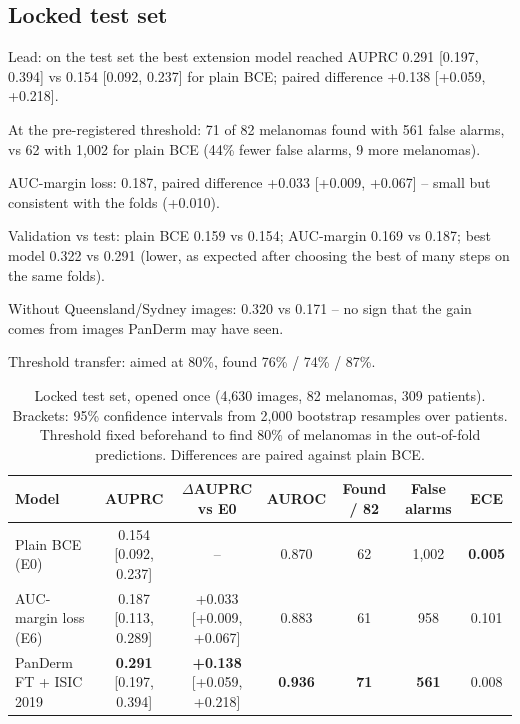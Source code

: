 \subsection{Locked test set}
\begin{notes}
  \item Lead: on the test set the best extension model reached AUPRC 0.291 [0.197, 0.394] vs 0.154 [0.092, 0.237] for plain BCE; paired difference +0.138 [+0.059, +0.218].
  \item At the pre-registered threshold: 71 of 82 melanomas found with 561 false alarms, vs 62 with 1,002 for plain BCE (44\% fewer false alarms, 9 more melanomas).
  \item AUC-margin loss: 0.187, paired difference +0.033 [+0.009, +0.067] -- small but consistent with the folds (+0.010).
  \item Validation vs test: plain BCE 0.159 vs 0.154; AUC-margin 0.169 vs 0.187; best model 0.322 vs 0.291 (lower, as expected after choosing the best of many steps on the same folds).
  \item Without Queensland/Sydney images: 0.320 vs 0.171 -- no sign that the gain comes from images PanDerm may have seen.
  \item Threshold transfer: aimed at 80\%, found 76\% / 74\% / 87\%.
\end{notes}

\begin{table}[t]
\centering
\caption{Locked test set, opened once (4,630 images, 82 melanomas, 309 patients). Brackets: 95\% confidence intervals from 2,000 bootstrap resamples over patients. Threshold fixed beforehand to find 80\% of melanomas in the out-of-fold predictions. Differences are paired against plain BCE.}
\label{tab:test}
\small
\begin{tabular}{@{}lcccccc@{}}
\toprule
Model & AUPRC & $\Delta$AUPRC vs E0 & AUROC & Found / 82 & False alarms & ECE \\
\midrule
Plain BCE (E0) & 0.154 [0.092, 0.237] & -- & 0.870 & 62 & 1,002 & \textbf{0.005} \\
AUC-margin loss (E6) & 0.187 [0.113, 0.289] & +0.033 [+0.009, +0.067] & 0.883 & 61 & 958 & 0.101 \\
PanDerm FT + ISIC 2019 & \textbf{0.291} [0.197, 0.394] & \textbf{+0.138} [+0.059, +0.218] & \textbf{0.936} & \textbf{71} & \textbf{561} & 0.008 \\
\bottomrule
\end{tabular}
\end{table}

